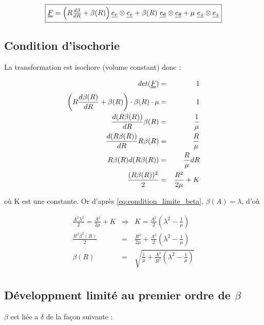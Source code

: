 \documentclass[a4paper,11pt]{article}
\newcommand{\tens}{\uuline}
\newcommand{\diage}[1]{\uline{e_{#1}} \otimes \uline{e_{#1}}}
\begin{document}
\begin{equation}
\fbox{$
\tens{F} =  \left(R\frac{d\beta}{dR} +\beta(R)\right) \diage{r} + \beta(R)\ \diage{\theta} + \mu\ \diage{z}
$}
\label{eq:exp_tenseur_compliquee}
\end{equation}

\subsection{Condition d'isochorie}
La transformation est isochore (volume constant) donc :

\begin{eqnarray*}
det( \tens{F}) &=& 1\\
\left(R \frac{d\beta(R)}{dR} + \beta(R)\right)\cdot \beta(R) \cdot \mu &=& 1\\
\frac{d (R \beta(R))}{dR} \beta(R) &=& \frac {1}{\mu}\\
\frac{d (R \beta(R))}{dR} R\beta(R) &=& \frac {R}{\mu}\\
R\beta(R) d(R\beta(R)) &=& \frac{R}{\mu} dR\\
\frac{(R\beta(R))^2}{2} &=& \frac{R^2}{2\mu}+K\\
\end{eqnarray*}

où K est une constante. Or d'après \ref{eq:condition_limite_beta}, $\beta(A) = \lambda$, d'où

\begin{eqnarray*}
\frac{A^2\lambda^2}{2} = \frac{A^2}{2\mu}+K &\Longrightarrow& K = \frac{A^2}{2}\left(\lambda^2-\frac{1}{\mu}\right)\\
\frac{R^2 \beta^2(R)}{2} &=& \frac{R^2}{2\mu}+\frac{A^2}{2}\left(\lambda^2 - \frac{1}{\mu}\right)\\
\beta(R) &=& \sqrt{\frac{1}{\mu}+ \frac{A^2}{R^2}\left(\lambda^2 - \frac{1}{\mu}\right)}\\
\end{eqnarray*}

\subsection{Développment limité au premier ordre de $\beta$}

$\beta$ est liée a $\delta$ de la façon suivante :
\end{document}

